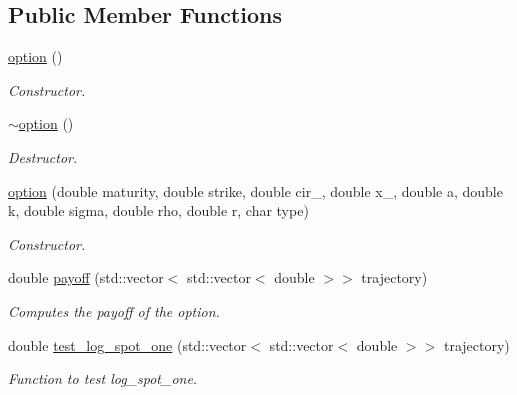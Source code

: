 \subsection*{Public Member Functions}
\begin{DoxyCompactItemize}
\item 
\mbox{\label{classoption_aae400d0330363c992401fd59b6b1e499}} 
\mbox{\hyperlink{classoption_aae400d0330363c992401fd59b6b1e499}{option}} ()
\begin{DoxyCompactList}\small\item\em Constructor. \end{DoxyCompactList}\item 
\mbox{\label{classoption_aeeb6541a65f9268f3e92cc8d1b1c2d16}} 
\mbox{\hyperlink{classoption_aeeb6541a65f9268f3e92cc8d1b1c2d16}{$\sim$option}} ()
\begin{DoxyCompactList}\small\item\em Destructor. \end{DoxyCompactList}\item 
\mbox{\label{classoption_ab2f0aa182faced1a9fa14ebe24485a13}} 
\mbox{\hyperlink{classoption_ab2f0aa182faced1a9fa14ebe24485a13}{option}} (double maturity, double strike, double cir\+\_, double x\+\_, double a, double k, double sigma, double rho, double r, char type)
\begin{DoxyCompactList}\small\item\em Constructor. \end{DoxyCompactList}\item 
\mbox{\label{classoption_adf5e2b045d960d18c7b97401f43c1183}} 
double \mbox{\hyperlink{classoption_adf5e2b045d960d18c7b97401f43c1183}{payoff}} (std\+::vector$<$ std\+::vector$<$ double $>$$>$ trajectory)
\begin{DoxyCompactList}\small\item\em Computes the payoff of the option. \end{DoxyCompactList}\item 
\mbox{\label{classoption_a9294c3eb114701089c0d3ffe89302f83}} 
double \mbox{\hyperlink{classoption_a9294c3eb114701089c0d3ffe89302f83}{test\+\_\+log\+\_\+spot\+\_\+one}} (std\+::vector$<$ std\+::vector$<$ double $>$$>$ trajectory)
\begin{DoxyCompactList}\small\item\em Function to test log\+\_\+spot\+\_\+one. \end{DoxyCompactList}\item 

\end{DoxyCompactItemize}

